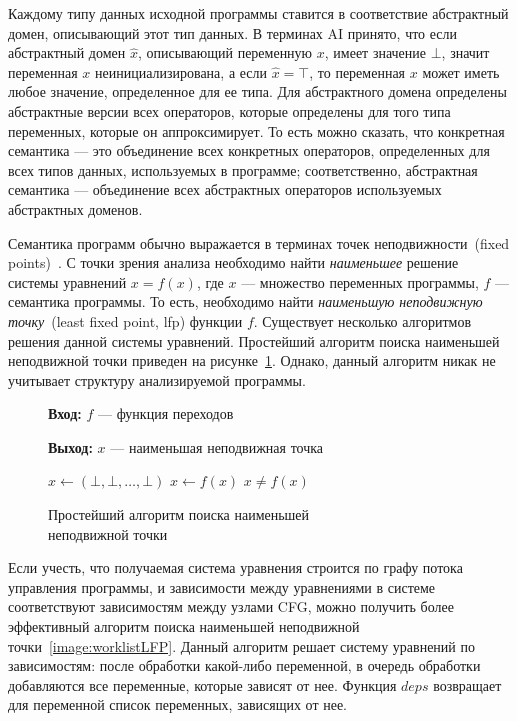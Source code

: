 Каждому типу данных исходной программы ставится в соответствие абстрактный
домен, описывающий этот тип данных. В терминах AI принято, что если абстрактный
домен $\hat{x}$, описывающий переменную $x$, имеет значение $\bot$, значит 
переменная $x$ неинициализирована, а если $\hat{x} = \top$, то переменная $x$
может иметь любое значение, определенное для ее типа. Для абстрактного домена
определены абстрактные версии всех операторов, которые определены для того
типа переменных, которые он аппроксимирует. То есть можно сказать, что 
конкретная семантика --- это объединение всех конкретных операторов, 
определенных для всех типов данных, используемых в программе; соответственно,
абстрактная семантика --- объединение всех абстрактных операторов используемых 
абстрактных доменов.

Семантика программ обычно выражается в терминах точек неподвижности~(fixed 
points)~\cite{fixedPoint}. С точки зрения анализа необходимо найти
\emph{наименьшее} решение системы уравнений $x = f(x)$, где $x$ --- множество
переменных программы, $f$ --- семантика программы. То есть, необходимо найти
\emph{наименьшую неподвижную точку}~(least fixed point, lfp) функции $f$.
Существует несколько алгоритмов решения данной системы уравнений. Простейший 
алгоритм поиска наименьшей неподвижной точки приведен на 
рисунке~\ref{image:nativeLFP}. Однако, данный алгоритм никак не учитывает 
структуру анализируемой программы.

\begin{figure}[h!]
\textbf{Вход:} $f$ --- функция переходов

\textbf{Выход:} $x$ --- наименьшая неподвижная точка

\begin{algorithmic} 
\State $x \gets (\bot, \bot, \ldots, \bot)$ 
\Repeat 
	\State $x \gets f(x)$ 
\Until $x \ne f(x)$ 
\end{algorithmic}

\caption{Простейший алгоритм поиска наименьшей\\неподвижной точки}
\label{image:nativeLFP}
\end{figure}

Если учесть, что получаемая система уравнения строится по графу потока 
управления программы, и зависимости между уравнениями в системе соответствуют
зависимостям между узлами CFG, можно получить более эффективный алгоритм поиска
наименьшей неподвижной точки~\ref{image:worklistLFP}. Данный алгоритм решает
систему уравнений по зависимостям: после обработки какой-либо переменной,
в очередь обработки добавляются все переменные, которые зависят от нее. Функция
$deps$ возвращает для переменной список переменных, зависящих от нее.

